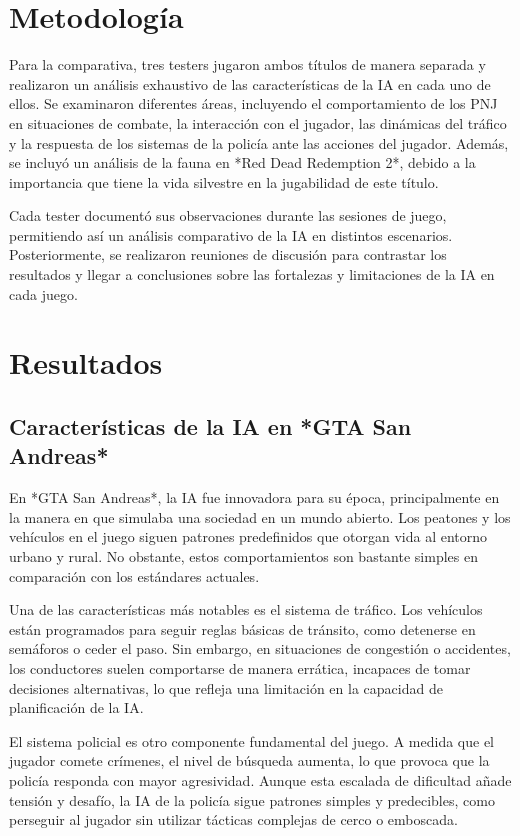 \documentclass[10pt]{article}
\begin{document}
\section{Metodología}
Para la comparativa, tres testers jugaron ambos títulos de manera separada y realizaron un análisis exhaustivo de las características de la IA en cada uno de ellos. Se examinaron diferentes áreas, incluyendo el comportamiento de los PNJ en situaciones de combate, la interacción con el jugador, las dinámicas del tráfico y la respuesta de los sistemas de la policía ante las acciones del jugador. Además, se incluyó un análisis de la fauna en *Red Dead Redemption 2*, debido a la importancia que tiene la vida silvestre en la jugabilidad de este título.

Cada tester documentó sus observaciones durante las sesiones de juego, permitiendo así un análisis comparativo de la IA en distintos escenarios. Posteriormente, se realizaron reuniones de discusión para contrastar los resultados y llegar a conclusiones sobre las fortalezas y limitaciones de la IA en cada juego.

\section{Resultados}
\subsection{Características de la IA en *GTA San Andreas*}
En *GTA San Andreas*, la IA fue innovadora para su época, principalmente en la manera en que simulaba una sociedad en un mundo abierto. Los peatones y los vehículos en el juego siguen patrones predefinidos que otorgan vida al entorno urbano y rural. No obstante, estos comportamientos son bastante simples en comparación con los estándares actuales.

Una de las características más notables es el sistema de tráfico. Los vehículos están programados para seguir reglas básicas de tránsito, como detenerse en semáforos o ceder el paso. Sin embargo, en situaciones de congestión o accidentes, los conductores suelen comportarse de manera errática, incapaces de tomar decisiones alternativas, lo que refleja una limitación en la capacidad de planificación de la IA.

El sistema policial es otro componente fundamental del juego. A medida que el jugador comete crímenes, el nivel de búsqueda aumenta, lo que provoca que la policía responda con mayor agresividad. Aunque esta escalada de dificultad añade tensión y desafío, la IA de la policía sigue patrones simples y predecibles, como perseguir al jugador sin utilizar tácticas complejas de cerco o emboscada.
\end{document}
